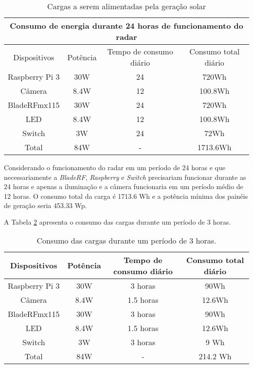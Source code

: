 \begin{table}[H]
\caption{Cargas a serem alimentadas pela geração solar}\label{tab24}
\begin{tabular}{|c|c|c|c|}
\hline
\multicolumn{4}{|c|}{Consumo de energia durante 24 horas de funcionamento do radar}                                                 \\ \hline
Dispositivos & Potência & Tempo de consumo diário & Consumo total diário \\ \hline
Raspberry Pi 3  & 30W  & 24  & 720Wh  \\ \hline
Câmera & 8.4W  & 12 & 100.8Wh \\ \hline
BladeRFmx115 & 30W  & 24 & 720Wh \\ \hline
LED       & 8.4W &  12 & 100.8Wh  \\ \hline
Switch       & 3W &  24 & 72Wh \\ \hline
Total & 84W & - & 1713.6Wh \\ \hline

\end{tabular}
\end{table}
\FloatBarrier

Considerando o funcionamento do radar em um período de 24 horas e que necessariamente a \textit{BladeRF}, \textit{Raspberry} e \textit{Switch} precisariam funcionar durante as 24 horas e apenas a iluminação e a câmera funcionaria em um período médio de 12 horas. O consumo total da carga é 1713.6 Wh e a potência mínima dos painéis de geração seria 453.33 Wp.

A Tabela \ref{tab6} apresenta o consumo das cargas durante um período de 3 horas.

\begin{table}[H]

\caption{\label{tab6}Consumo das cargas durante um período de 3 horas.}
\begin{tabular}{|c|c|c|c|} 

\hline
Dispositivos             & Potência         & Tempo de consumo diário & Consumo total diário \\ \hline
Raspberry Pi 3  & 30W  & 3 horas          & 90Wh    \\ \hline
Câmera & 8.4W  &   1.5 horas        & 12.6Wh \\ \hline
BladeRFmx115 & 30W  & 3 horas         & 90Wh \\ \hline
LED       & 8.4W &  1.5 horas & 12.6Wh    \\ \hline
Switch       & 3W &  3 horas & 9 Wh    \\ \hline
Total & 84W & - & 214.2 Wh \\ \hline

\end{tabular}
\end{table}
\FloatBarrier


